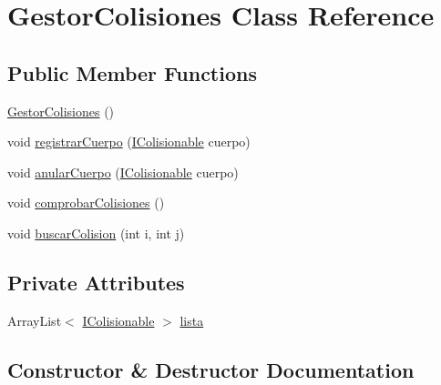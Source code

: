 \hypertarget{class_gestor_colisiones}{}\section{Gestor\+Colisiones Class Reference}
\label{class_gestor_colisiones}
\subsection*{Public Member Functions}
\begin{DoxyCompactItemize}
\item 
\mbox{\hyperlink{class_gestor_colisiones_ae0f419effcf9a15adad00cc36f792f5a}{Gestor\+Colisiones}} ()
\item 
void \mbox{\hyperlink{class_gestor_colisiones_aa507081e558aa27c6e9d7be44e2e620e}{registrar\+Cuerpo}} (\mbox{\hyperlink{interface_i_colisionable}{I\+Colisionable}} cuerpo)
\item 
void \mbox{\hyperlink{class_gestor_colisiones_acf5c4b8e58066b5e89c1ec9c16417acd}{anular\+Cuerpo}} (\mbox{\hyperlink{interface_i_colisionable}{I\+Colisionable}} cuerpo)
\item 
void \mbox{\hyperlink{class_gestor_colisiones_a9ac496985991a5271cf639db982e85f4}{comprobar\+Colisiones}} ()
\item 
void \mbox{\hyperlink{class_gestor_colisiones_a74fa3551ed7f8a2f8d045b8978953835}{buscar\+Colision}} (int i, int j)
\end{DoxyCompactItemize}
\subsection*{Private Attributes}
\begin{DoxyCompactItemize}
\item 
Array\+List$<$ \mbox{\hyperlink{interface_i_colisionable}{I\+Colisionable}} $>$ \mbox{\hyperlink{class_gestor_colisiones_a549c1c33a353c2929b060fb9474e90ea}{lista}}
\end{DoxyCompactItemize}


\subsection{Constructor \& Destructor Documentation}
\mbox{\label{class_gestor_colisiones_ae0f419effcf9a15adad00cc36f792f5a}} 
